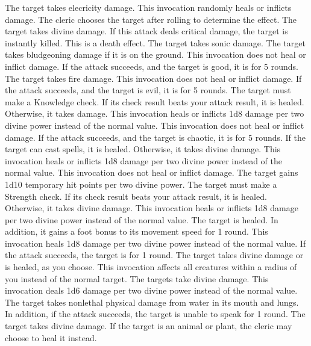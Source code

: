 The target takes elecricity damage.
This invocation randomly heals or inflicts damage.
The cleric chooses the target after rolling to determine the effect.
The target takes divine damage.
If this attack deals critical damage, the target is instantly killed.
This is a death effect.
The target takes sonic damage.
The target takes bludgeoning damage if it is on the ground.
This invocation does not heal or inflict damage.
If the attack succeeds, and the target is good, it is \staggered for 5 rounds.
The target takes fire damage.
This invocation does not heal or inflict damage.
If the attack succeeds, and the target is evil, it is \dazed for 5 rounds.
The target must make a Knowledge check.
If its check result beats your attack result, it is healed.
Otherwise, it takes damage.
This invocation heals or inflicts 1d8 damage per two divine power instead of the normal value.
This invocation does not heal or inflict damage.
If the attack succeeds, and the target is chaotic, it is \immobilized for 5 rounds.
If the target can cast spells, it is healed.
Otherwise, it takes divine damage.
This invocation heals or inflicts 1d8 damage per two divine power instead of the normal value.
This invocation does not heal or inflict damage.
The target gains 1d10 temporary hit points per two divine power.
The target must make a Strength check.
If its check result beats your attack result, it is healed.
Otherwise, it takes divine damage.
This invocation heals or inflicts 1d8 damage per two divine power instead of the normal value.
The target is healed.
In addition, it gains a  foot bonus to its movement speed for 1 round.
This invocation heals 1d8 damage per two divine power instead of the normal value.
If the attack succeeds, the target is \disoriented for 1 round.
The target takes divine damage or is healed, as you choose.
This invocation affects all creatures within a \areasmall radius of you instead of the normal target.
The targets take divine damage.
This invocation deals 1d6 damage per two divine power instead of the normal value.
The target takes nonlethal physical damage from water in its mouth and lungs.
In addition, if the attack succeeds, the target is unable to speak for 1 round.
The target takes divine damage.
If the target is an animal or plant, the cleric may choose to heal it instead.

